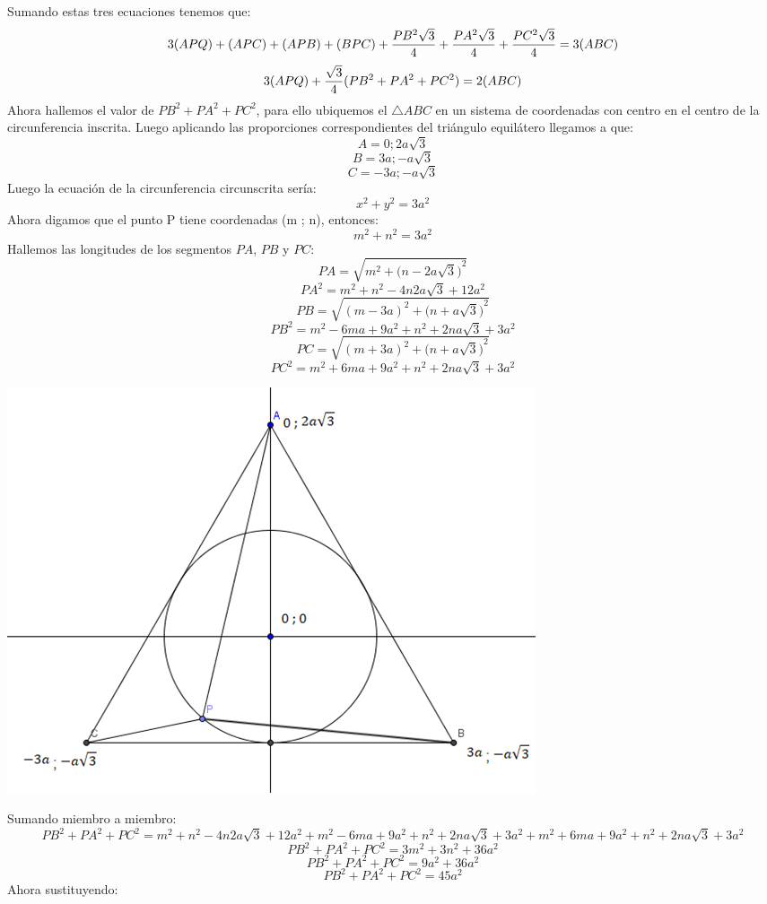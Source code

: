 \documentclass{book}
\begin{document}
\begin{enumerate}
        Sumando estas tres ecuaciones tenemos que:
        $$3(APQ)+(APC)+(APB)+(BPC)+{PB^2\sqrt{3}\over 4}+{PA^2\sqrt{3}\over 4}+{PC^2\sqrt{3}\over 4}=3(ABC)$$
        $$3(APQ)+{\sqrt{3}\over 4} (PB^2+PA^2+PC^2 )=2(ABC)$$
        Ahora hallemos el valor de $PB^2+PA^2+PC^2$, para ello ubiquemos el $\triangle ABC$ en un sistema de coordenadas con centro en el centro de la circunferencia inscrita. Luego aplicando las proporciones correspondientes del triángulo equilátero llegamos a que:
        $$A=0 ;2a\sqrt{3}$$
        $$B=3a ; -a\sqrt{3}$$
        $$C=-3a ; -a\sqrt{3}$$
        Luego la ecuación de la circunferencia circunscrita sería:
        $$x^2+y^2=3a^2$$
        Ahora digamos que el punto P tiene coordenadas (m ; n), entonces:
        $$m^2+n^2=3a^2$$
        Hallemos las longitudes de los segmentos $PA$, $PB$ y $PC$:
        $$PA=\sqrt{m^2+{\big(n-2a\sqrt{3}\big)}^2 }$$
        $$PA^2=m^2+n^2-4n2a\sqrt{3}+12a^2$$
        $$PB=\sqrt{{(m-3a)}^2+{\big(n+a\sqrt{3}\big)}^2 }$$
        $$PB^2=m^2-6ma+9a^2+n^2+2na\sqrt{3}+3a^2$$
        $$PC=\sqrt{{(m+3a)}^2+{\big(n+a\sqrt{3}\big)}^2 }$$
        $$PC^2=m^2+6ma+9a^2+n^2+2na\sqrt{3}+3a^2$$
        \begin{center}
            \includegraphics[scale=1]{imagenes/Geometria/24,2.png}
        \end{center}
        Sumando miembro a miembro:
        $$PB^2+PA^2+PC^2=m^2+n^2-4n2a\sqrt{3}+12a^2+m^2-6ma+9a^2+n^2+2na\sqrt{3}+3a^2+m^2+6ma+9a^2+n^2+2na\sqrt{3}+3a^2$$
        $$PB^2+PA^2+PC^2=3m^2+3n^2+36a^2$$
        $$PB^2+PA^2+PC^2=9a^2+36a^2$$
        $$PB^2+PA^2+PC^2=45a^2$$
        Ahora sustituyendo:

\end{enumerate}
\end{document}
